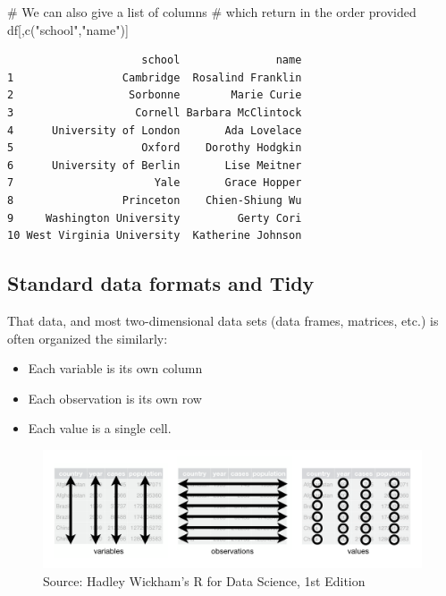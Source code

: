 \documentclass[
  letterpaper,
  DIV=11,
  numbers=noendperiod]{scrreprt}
\newenvironment{Shaded}{\begin{snugshade}}{\end{snugshade}}
\newcommand{\CommentTok}[1]{\textcolor[rgb]{0.37,0.37,0.37}{#1}}
\newcommand{\FunctionTok}[1]{\textcolor[rgb]{0.28,0.35,0.67}{#1}}
\newcommand{\NormalTok}[1]{\textcolor[rgb]{0.00,0.23,0.31}{#1}}
\newcommand{\StringTok}[1]{\textcolor[rgb]{0.13,0.47,0.30}{#1}}
\begin{document}
\begin{Shaded}
\begin{Highlighting}[]
\CommentTok{\# We can also give a list of columns}
\CommentTok{\# which return in the order provided}
\NormalTok{df[,}\FunctionTok{c}\NormalTok{(}\StringTok{"school"}\NormalTok{,}\StringTok{"name"}\NormalTok{)]}
\end{Highlighting}
\end{Shaded}

\begin{verbatim}
                     school               name
1                 Cambridge  Rosalind Franklin
2                  Sorbonne        Marie Curie
3                   Cornell Barbara McClintock
4      University of London       Ada Lovelace
5                    Oxford    Dorothy Hodgkin
6      University of Berlin       Lise Meitner
7                      Yale       Grace Hopper
8                 Princeton    Chien-Shiung Wu
9     Washington University         Gerty Cori
10 West Virginia University  Katherine Johnson
\end{verbatim}

\subsection{Standard data formats and
Tidy}\label{standard-data-formats-and-tidy}

That data, and most two-dimensional data sets (data frames, matrices,
etc.) is often organized the similarly:

\begin{itemize}
\item
  Each variable is its own column
\item
  Each observation is its own row
\item
  Each value is a single cell.
\end{itemize}

\begin{figure}[H]

{\centering \includegraphics[width=1\textwidth,height=\textheight]{scripts/03_dataWrangling/wrangling-files/tidy-style.png}

}

\caption{Source: Hadley Wickham's R for Data Science, 1st Edition}

\end{figure}%
\end{document}

